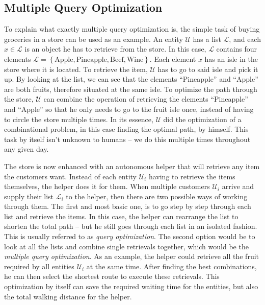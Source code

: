\subsection{Multiple Query Optimization}
To explain what exactly multiple query optimization is, the simple task of buying groceries in a store can be used as an example. An entity $\mathcal{U}$ has a list $\mathcal{L}$, and each $x \in \mathcal{L}$ is an object he has to retrieve from the store. In this case, $\mathcal{L}$ contains four elements $\mathcal{L} = \left\{ \text{Apple}, \text{Pineapple}, \text{Beef}, \text{Wine}\right\}$. Each element $x$ has an isle in the store where it is located. To retrieve the item, $\mathcal{U}$ has to go to said isle and pick it up. By looking at the list, we can see that the elements “Pineapple” and “Apple” are both fruits, therefore situated at the same isle. To optimize the path through the store, $\mathcal{U}$ can combine the operation of retrieving the elements “Pineapple” and “Apple” so that he only needs to go to the fruit isle once, instead of having to circle the store multiple times. In its essence, $\mathcal{U}$ did the optimization of a combinational problem, in this case finding the optimal path, by himself. This task by itself isn't unknown to humans – we do this multiple times throughout any given day. \par
The store is now enhanced with an autonomous helper that will retrieve any item the customers want. Instead of each entity $\mathcal{U}_i$ having to retrieve the items themselves, the helper does it for them. When multiple customers $\mathcal{U}_i$ arrive and supply their list $\mathcal{L}_i$ to the helper, then there are two possible ways of working through them. The first and most basic one, is to go step by step through each list and retrieve the items. In this case, the helper can rearrange the list to shorten the total path – but he still goes through each list in an isolated fashion. This is usually referred to as \emph{query optimization}. The second option would be to look at all the lists and combine single retrievals together, which would be the \emph{multiple query optimization}. As an example, the helper could retrieve all the fruit required by all entities $\mathcal{U}_i$ at the same time. After finding the best combinations, he can then select the shortest route to execute these retrievals. This optimization by itself can save the required waiting time for the entities, but also the total walking distance for the helper.\par
